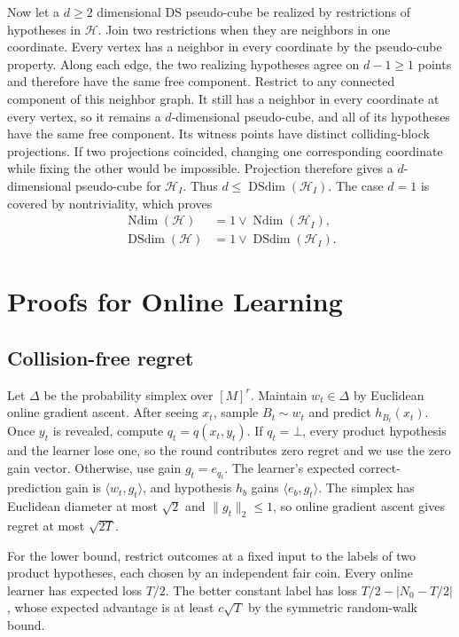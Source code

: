 \documentclass[twoside]{article}
\newcommand{\Ndim}{\operatorname{Ndim}}
\newcommand{\DSdim}{\operatorname{DSdim}}
\begin{document}
Now let a $d\geq2$ dimensional DS pseudo-cube be realized by restrictions of hypotheses in $\mathcal H$. Join two restrictions when they are neighbors in one coordinate. Every vertex has a neighbor in every coordinate by the pseudo-cube property. Along each edge, the two realizing hypotheses agree on $d-1\geq1$ points and therefore have the same free component. Restrict to any connected component of this neighbor graph. It still has a neighbor in every coordinate at every vertex, so it remains a $d$-dimensional pseudo-cube, and all of its hypotheses have the same free component. Its witness points have distinct colliding-block projections. If two projections coincided, changing one corresponding coordinate while fixing the other would be impossible. Projection therefore gives a $d$-dimensional pseudo-cube for $\mathcal H_I$. Thus $d\leq\DSdim(\mathcal H_I)$. The case $d=1$ is covered by nontriviality, which proves
\begin{align*}
 \Ndim(\mathcal H)&=1\vee\Ndim(\mathcal H_I),\\
 \DSdim(\mathcal H)&=1\vee\DSdim(\mathcal H_I).
\end{align*}

\section{Proofs for Online Learning}
\label{app:online}

\subsection{Collision-free regret}

Let $\Delta$ be the probability simplex over $[M]^r$. Maintain $w_t\in\Delta$ by Euclidean online gradient ascent. After seeing $x_t$, sample $B_t\sim w_t$ and predict $h_{B_t}(x_t)$. Once $y_t$ is revealed, compute $q_t=q(x_t,y_t)$. If $q_t=\bot$, every product hypothesis and the learner lose one, so the round contributes zero regret and we use the zero gain vector. Otherwise, use gain $g_t=e_{q_t}$. The learner's expected correct-prediction gain is $\langle w_t,g_t\rangle$, and hypothesis $h_b$ gains $\langle e_b,g_t\rangle$. The simplex has Euclidean diameter at most $\sqrt2$ and $\|g_t\|_2\leq1$, so online gradient ascent gives regret at most $\sqrt{2T}$.

For the lower bound, restrict outcomes at a fixed input to the labels of two product hypotheses, each chosen by an independent fair coin. Every online learner has expected loss $T/2$. The better constant label has loss $T/2-|N_0-T/2|$, whose expected advantage is at least $c\sqrt T$ by the symmetric random-walk bound.
\end{document}
